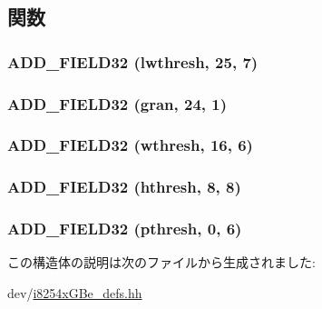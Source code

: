 \subsection{関数}
\hypertarget{structiGbReg_1_1Regs_1_1TXDCTL_a0609706ae3425a06cf231a18fce2db64}{
\subsubsection[{ADD\_\-FIELD32}]{\setlength{\rightskip}{0pt plus 5cm}ADD\_\-FIELD32 (lwthresh, \/  25, \/  7)}}
\label{structiGbReg_1_1Regs_1_1TXDCTL_a0609706ae3425a06cf231a18fce2db64}
\hypertarget{structiGbReg_1_1Regs_1_1TXDCTL_acdf2ad81a44f986c1547302a94bbfa34}{
\subsubsection[{ADD\_\-FIELD32}]{\setlength{\rightskip}{0pt plus 5cm}ADD\_\-FIELD32 (gran, \/  24, \/  1)}}
\label{structiGbReg_1_1Regs_1_1TXDCTL_acdf2ad81a44f986c1547302a94bbfa34}
\hypertarget{structiGbReg_1_1Regs_1_1TXDCTL_a352305079deadad339f18b9f60b5791b}{
\subsubsection[{ADD\_\-FIELD32}]{\setlength{\rightskip}{0pt plus 5cm}ADD\_\-FIELD32 (wthresh, \/  16, \/  6)}}
\label{structiGbReg_1_1Regs_1_1TXDCTL_a352305079deadad339f18b9f60b5791b}
\hypertarget{structiGbReg_1_1Regs_1_1TXDCTL_a8107a874c1cce758418296e676ef49cf}{
\subsubsection[{ADD\_\-FIELD32}]{\setlength{\rightskip}{0pt plus 5cm}ADD\_\-FIELD32 (hthresh, \/  8, \/  8)}}
\label{structiGbReg_1_1Regs_1_1TXDCTL_a8107a874c1cce758418296e676ef49cf}
\hypertarget{structiGbReg_1_1Regs_1_1TXDCTL_acca8f40dfe6ce58aac4678e3b089f191}{
\subsubsection[{ADD\_\-FIELD32}]{\setlength{\rightskip}{0pt plus 5cm}ADD\_\-FIELD32 (pthresh, \/  0, \/  6)}}
\label{structiGbReg_1_1Regs_1_1TXDCTL_acca8f40dfe6ce58aac4678e3b089f191}


この構造体の説明は次のファイルから生成されました:\begin{DoxyCompactItemize}
\item 
dev/\hyperlink{i8254xGBe__defs_8hh}{i8254xGBe\_\-defs.hh}\end{DoxyCompactItemize}
